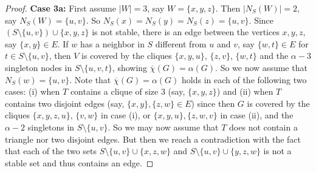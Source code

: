 \documentclass[11pt]{article}
\numberwithin{equation}{section}
\begin{document}
\begin{proof}
{\bf Case 3a:} First assume $|W|=3$, say $W=\{x,y,z\}$. Then $|N_S(W)|=2$, say $N_S(W)=\{u,v\}$.
     So   $N_S(x)=N_S(y)=N_S(z)=\{u,v\}$.
Since $(S\setminus \{u,v\})\cup \{x,y,z\}$ is not stable, there is an edge between the vertices $x,y,z$, say $\{x,y\}\in E$. If $w$ has a neighbor in $S$ different from $u$ and $v$, say $\{w,t\}\in E$ for $t\in S\setminus\{u,v\}$, then $V$ is covered by the cliques $\{x,y,u\}$, $\{z,v\}$, $\{w,t\}$ and the $\alpha -3$ singleton nodes in $S\setminus \{u,v,t\}$, showing $\overline\chi(G)=\alpha(G)$. So we now  assume that $N_S(w)=\{u,v\}$. Note that $\overline \chi(G)=\alpha(G)$ holds in each of the following two cases: (i) when $T$ contains a clique of size 3 (say, $\{x,y,z\}$) and (ii) when $T$ contains two disjoint edges (say, $\{x,y\},\{z,w\}\in E$) since then 
$G$ is covered by the cliques $\{x,y,z,u\}$, $\{v,w\}$ in case (i), or $\{x,y,u\},\{z,w,v\}$ in case (ii), and the $\alpha-2$ singletons in $S\setminus \{u,v\}$. So we may now assume that $T$ does not contain a triangle nor two disjoint edges. But then we reach a contradiction with the fact that each of the two sets $S\setminus\{u,v\}\cup\{x,z,w\}$ and $S\setminus\{u,v\}\cup\{y,z,w\}$ is not a stable set and thus contains an edge.


\end{proof}
\end{document}
